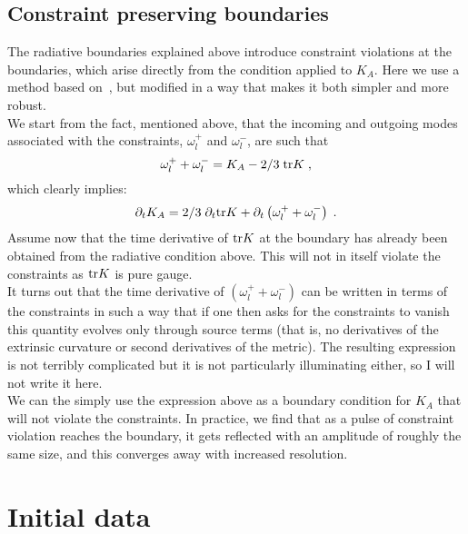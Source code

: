 \documentclass[12pt]{article}
\begin{document}
\subsection{Constraint preserving boundaries}

The radiative boundaries explained above introduce constraint
violations at the boundaries, which arise directly from the condition
applied to $K_A$. Here we use a method based on~\cite{Alcubierre15},
but modified in a way that makes it both simpler and more robust. \\

We start from the fact, mentioned above, that the incoming and outgoing modes
associated with the constraints, $\omega^+_l$ and $\omega^-_l$, are such that
\begin{equation}
\omega^+_l + \omega^-_l = K_A - 2/3 \; {\rm tr} K \; ,
\end{equation}
which clearly implies:
\begin{equation}
\partial_t K_A = 2/3 \; \partial_t {\rm tr} K
+ \partial_t \left( \omega^+_l + \omega^-_l \right) \; .
\end{equation}
Assume now that the time derivative of ${\rm tr} K$ at the boundary
has already been obtained from the radiative condition above.  This
will not in itself violate the constraints as ${\rm tr} K$ is pure
gauge. \\

It turns out that the time derivative of $\left( \omega^+_l +
\omega^-_l \right)$ can be written in terms of the constraints in such
a way that if one then asks for the constraints to vanish this
quantity evolves only through source terms (that is, no derivatives of
the extrinsic curvature or second derivatives of the metric). The
resulting expression is not terribly complicated but it is not
particularly illuminating either, so I will not write it here. \\

We can the simply use the expression above as a boundary condition for
$K_A$ that will not violate the constraints. In practice, we find that
as a pulse of constraint violation reaches the boundary, it gets
reflected with an amplitude of roughly the same size, and this
converges away with increased resolution. \\



\setcounter{equation}{0}
\section{Initial data}
\label{sec:initial}
\end{document}
